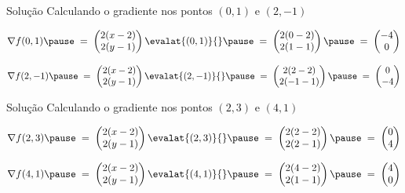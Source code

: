 \begin{resolution}{Solução}
  Calculando o gradiente nos pontos
  \((0,  1)\) e
  \((2, -1)\)

  \pause
  \[
    \nabla f(0, 1)
    \pause
    \;=\; \begin{pmatrix}
      2(x-2) \\ 2(y-1)
    \end{pmatrix} \evalat{(0, 1)}{}
    \pause
    \;=\; \begin{pmatrix}
    2(0-2) \\ 2(1-1)
    \end{pmatrix}
    \pause
    \;=\; \begin{pmatrix}
    -4 \\ 0
    \end{pmatrix}
  \]

  \pause
  \[
    \nabla f(2, -1)
    \pause
    \;=\; \begin{pmatrix}
      2(x-2) \\ 2(y-1)
    \end{pmatrix} \evalat{(2, -1)}{}
    \pause
    \;=\; \begin{pmatrix}
      2(2-2) \\ 2(-1-1)
    \end{pmatrix}
    \pause
    \;=\; \begin{pmatrix}
      0 \\ -4
    \end{pmatrix}
  \]
\end{resolution}

\begin{resolution}{Solução}
  Calculando o gradiente nos pontos
  \((2,  3)\) e
  \((4,  1)\)

  \pause
  \[
    \nabla f(2, 3)
    \pause
    \;=\; \begin{pmatrix}
      2(x-2) \\ 2(y-1)
    \end{pmatrix} \evalat{(2, 3)}{}
    \pause
    \;=\; \begin{pmatrix}
      2(2-2) \\ 2(2-1)
    \end{pmatrix}
    \pause
    \;=\; \begin{pmatrix}
      0 \\ 4
    \end{pmatrix}
  \]

  \pause
  \[
    \nabla f(4, 1)
    \pause
    \;=\; \begin{pmatrix}
      2(x-2) \\ 2(y-1)
    \end{pmatrix} \evalat{(4, 1)}{}
    \pause
    \;=\; \begin{pmatrix}
      2(4-2) \\ 2(1-1)
    \end{pmatrix}
    \pause
    \;=\; \begin{pmatrix}
      4 \\ 0
    \end{pmatrix}
  \]
\end{resolution}

